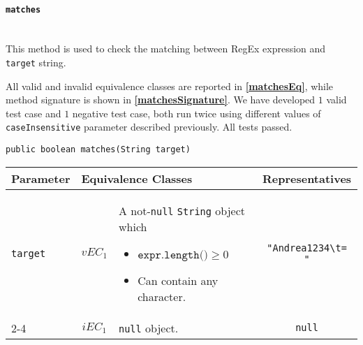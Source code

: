 \documentclass[sigconf]{acmart}
\begin{document}
\paragraph{\texttt{matches}}
\hfill\\
This method is used to check the matching between RegEx expression and \texttt{target} string.  

All valid and invalid equivalence classes are reported in \textbf{\cref{matchesEq}}, while method signature is shown in \textbf{\cref{matchesSignature}}. We have developed $1$ valid test case and $1$ negative test case, both run twice using different values of \texttt{caseInsensitive} parameter described previously. All tests passed.

\begin{lstlisting}[frame=lines,basicstyle=\ttfamily\tiny, caption={Signature of method \texttt{matches}}, label={matchesSignature}]
public boolean matches(String target)
\end{lstlisting}

\begin{table*}
\footnotesize
\caption{Equivalence classes and representatives of \texttt{matches} method}
\label{matchesEq}
\centering
\begin{tabular}{l|cm{10.5cm}|c}
\toprule
    \textbf{Parameter} & \multicolumn{2}{|l|}{\textbf{Equivalence Classes}} & \textbf{Representatives} \\
    \midrule
    
	\texttt{target} & $vEC_1$ & A not-\texttt{null} \texttt{String} object which
	\begin{itemize}
	\item  $\texttt{expr.length()} \geq 0$
	\item Can contain any character. 
\end{itemize}		
	& \texttt{"Andrea1234\textbackslash t= "}
    
    \\\cline{2-4}   
    
    & $iEC_1$ & \texttt{null} object. & \texttt{null} 
   
    
     \\  
    
    \bottomrule
  \end{tabular}
\end{table*}



\end{document}
